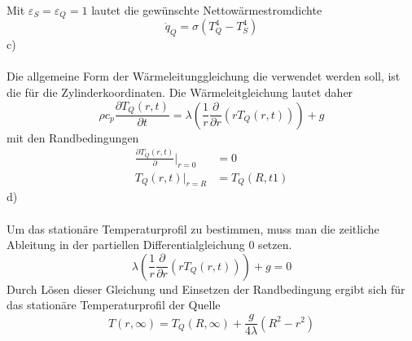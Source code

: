 Mit $\varepsilon_S = \varepsilon_Q = 1$ lautet die gewünschte Nettowärmestromdichte
\[
	\dot{q}_Q = \sigma(T_Q^4 - T_S^4)
\]
\newpage
\noindent
c) \\ \\
Die allgemeine Form der Wärmeleitunggleichung die verwendet werden soll, ist die für die Zylinderkoordinaten. Die Wärmeleitgleichung lautet daher
\[
	\rho c_p\frac{\partial T_Q(r,t)}{\partial t} = \lambda \left(\frac{1}{r}\frac{\partial}{\partial r}(rT_Q(r,t))\right) + g
\]
mit den Randbedingungen
\begin{align*}
	\frac{\partial T_Q(r,t)}{\partial}\Biggl|_{r = 0} &= 0 \\
	T_Q(r,t)\biggl|_{r = R} &= T_Q(R,t1)
\end{align*}
d) \\ \\
Um das stationäre Temperaturprofil zu bestimmen, muss man die zeitliche Ableitung in der partiellen Differentialgleichung 0 setzen.
\[
	\lambda \left(\frac{1}{r}\frac{\partial}{\partial r}(rT_Q(r,t))\right) + g = 0
\]
Durch Lösen dieser Gleichung und Einsetzen der Randbedingung ergibt sich für das stationäre Temperaturprofil der Quelle
\[
	T(r,\infty) = T_Q(R,\infty) + \frac{g}{4\lambda}\left(R^2 - r^2\right)
\]